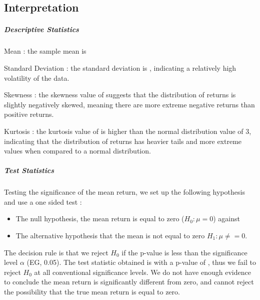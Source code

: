 \documentclass{article}
\begin{document}
\subsection*{Interpretation}

\subparagraph{Descriptive Statistics}  

Mean : the sample mean is \amu 

Standard Deviation : the standard deviation is \asigma, indicating a relatively high volatility of the data. 

Skewness : the skewness value of \askew suggests that the distribution of returns is slightly negatively skewed, meaning there are more extreme negative returns than positive returns. 

Kurtosis : the kurtosis value of \akurt is higher than the normal distribution value of 3, indicating that the distribution of returns has heavier tails and more extreme values when compared to a normal distribution. 

\subparagraph{Test Statistics}

Testing the significance of the mean return, we set up the following hypothesis and use a one sided test :
\begin{itemize}
	\item The null hypothesis, the mean return is equal to zero ($H_0 : \mu =0$) against
	\item The alternative hypothesis that the mean is not equal to zero $H_1 : \mu \neq = 0$.
\end{itemize}
The decision rule is that we reject $H_0$ if the p-value is less than the significance level $\alpha$ (EG, 0.05). 
The test statistic obtained is \amut with a p-value of \amup, thus we fail to reject $H_0$ at all conventional significance levels. 
We do not have enough evidence to conclude the mean return is significantly different from zero, and cannot reject the possibility that the true mean return is equal to zero. 
\end{document}
